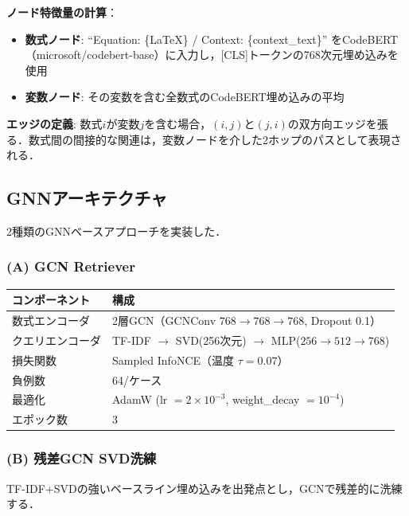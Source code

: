 \documentclass[11pt,a4paper]{ltjsarticle}
\begin{document}
\textbf{ノード特徴量の計算}：
\begin{itemize}[nosep]
  \item \textbf{数式ノード}: ``Equation: \{LaTeX\} / Context: \{context\_text\}'' をCodeBERT（microsoft/codebert-base）に入力し，[CLS]トークンの768次元埋め込みを使用
  \item \textbf{変数ノード}: その変数を含む全数式のCodeBERT埋め込みの平均
\end{itemize}

\textbf{エッジの定義}: 数式$i$が変数$j$を含む場合，$(i,j)$と$(j,i)$の双方向エッジを張る．数式間の間接的な関連は，変数ノードを介した2ホップのパスとして表現される．

\subsection{GNNアーキテクチャ}

2種類のGNNベースアプローチを実装した．

\subsubsection{(A) GCN Retriever}

\begin{table}[h]
\centering
\begin{tabular}{ll}
\toprule
コンポーネント & 構成 \\
\midrule
数式エンコーダ & 2層GCN（GCNConv $768 \to 768 \to 768$, Dropout 0.1） \\
クエリエンコーダ & TF-IDF $\to$ SVD(256次元) $\to$ MLP($256 \to 512 \to 768$) \\
損失関数 & Sampled InfoNCE（温度 $\tau = 0.07$） \\
負例数 & 64/ケース \\
最適化 & AdamW (lr $= 2\times10^{-3}$, weight\_decay $= 10^{-4}$) \\
エポック数 & 3 \\
\bottomrule
\end{tabular}
\end{table}

\subsubsection{(B) 残差GCN SVD洗練}

TF-IDF+SVDの強いベースライン埋め込みを出発点とし，GCNで残差的に洗練する．
\end{document}
